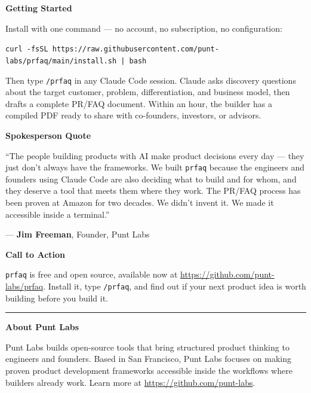 \documentclass[11pt,letterpaper]{article}
\newcommand{\prsection}[1]{%
  \vspace{1em}%
  {\large\bfseries\color{SectionBlue}#1}%
  \vspace{0.3em}\par%
}
\begin{document}
\prsection{Getting Started}

Install with one command --- no account, no subscription, no configuration:

\smallskip
{\small\noindent\texttt{curl -fsSL https://raw.githubusercontent.com/punt-labs/prfaq/main/install.sh | bash}}
\smallskip

\noindent Then type \texttt{/prfaq} in any Claude Code session. Claude asks discovery questions about the target customer, problem, differentiation, and business model, then drafts a complete PR/FAQ document. Within an hour, the builder has a compiled PDF ready to share with co-founders, investors, or advisors.

\prsection{Spokesperson Quote}

\begin{spokespersonquote}
``The people building products with AI make product decisions every day --- they just don't always have the frameworks. We built \texttt{prfaq} because the engineers and founders using Claude Code are also deciding what to build and for whom, and they deserve a tool that meets them where they work. The PR/FAQ process has been proven at Amazon for two decades. We didn't invent it. We made it accessible inside a terminal.''

\raggedleft --- \textbf{Jim Freeman}, Founder, Punt Labs
\end{spokespersonquote}

\prsection{Call to Action}

\texttt{prfaq} is free and open source, available now at \url{https://github.com/punt-labs/prfaq}. Install it, type \texttt{/prfaq}, and find out if your next product idea is worth building before you build it.

\vspace{2em}
\noindent\rule{\textwidth}{0.4pt}
\vspace{0.5em}

\noindent\textbf{About Punt Labs}

\noindent Punt Labs builds open-source tools that bring structured product thinking to engineers and founders. Based in San Francisco, Punt Labs focuses on making proven product development frameworks accessible inside the workflows where builders already work. Learn more at \url{https://github.com/punt-labs}.
\end{document}
